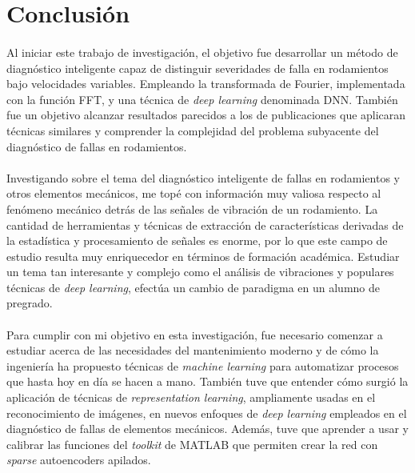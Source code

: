 \documentclass[12pt]{article}
\begin{document}
\section{Conclusión}
\paragraph{}
Al iniciar este trabajo de investigación, el objetivo fue desarrollar un método de diagnóstico inteligente capaz de distinguir severidades de falla en rodamientos bajo velocidades variables. Empleando la transformada de Fourier, implementada con la función FFT, y una técnica de \textit{deep learning} denominada DNN. También fue un objetivo alcanzar resultados parecidos a los de publicaciones que aplicaran técnicas similares y comprender la complejidad del problema subyacente del diagnóstico de fallas en rodamientos.

\paragraph{}
Investigando sobre el tema del diagnóstico inteligente de fallas en rodamientos y otros elementos mecánicos, me topé con información muy valiosa respecto al fenómeno mecánico detrás de las señales de vibración de un rodamiento. La cantidad de herramientas y técnicas de extracción de características derivadas de la estadística y procesamiento de señales es enorme, por lo que este campo de estudio resulta muy enriquecedor en términos de formación académica. Estudiar un tema tan interesante y complejo como el análisis de vibraciones y populares técnicas de \textit{deep learning}, efectúa un cambio de paradigma en un alumno de pregrado.

\paragraph{}
Para cumplir con mi objetivo en esta investigación, fue necesario comenzar a estudiar acerca de las necesidades del mantenimiento moderno y de cómo la ingeniería ha propuesto técnicas de \textit{machine learning} para automatizar procesos que hasta hoy en día se hacen a mano. También tuve que entender cómo surgió la aplicación de técnicas de \textit{representation learning}, ampliamente usadas en el reconocimiento de imágenes, en nuevos enfoques de \textit{deep learning} empleados en el diagnóstico de fallas de elementos mecánicos. Además, tuve que aprender a usar y calibrar las funciones del \textit{toolkit} de MATLAB que permiten crear la red con \textit{sparse} autoencoders apilados.
\end{document}
